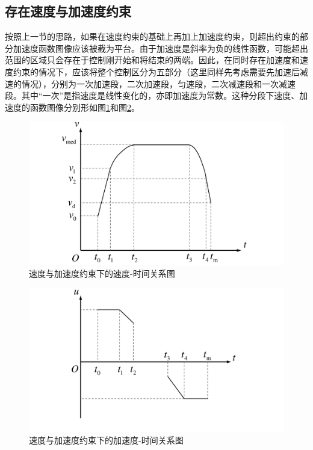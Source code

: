 \subsection{存在速度与加速度约束}
按照上一节的思路，如果在速度约束的基础上再加上加速度约束，则超出约束的部分加速度函数图像应该被截为平台。由于加速度是斜率为负的线性函数，可能超出范围的区域只会存在于控制刚开始和将结束的两端。因此，在同时存在加速度和速度约束的情况下，应该将整个控制区分为五部分（这里同样先考虑需要先加速后减速的情况），分别为一次加速段，二次加速段，匀速段，二次减速段和一次减速段。其中“一次”是指速度是线性变化的，亦即加速度为常数。这种分段下速度、加速度的函数图像分别形如图\ref{fig:ucv}和图\ref{fig:ucu}。
\begin{figure}[htbp]
\centering
\includegraphics[width=12cm]{figures/ucv.pdf}
\caption{速度与加速度约束下的速度-时间关系图}
\label{fig:ucv}
\end{figure}
\begin{figure}[htbp]
\centering
\includegraphics[width=12cm]{figures/ucu.pdf}
\caption{速度与加速度约束下的加速度-时间关系图}
\label{fig:ucu}
\end{figure}

